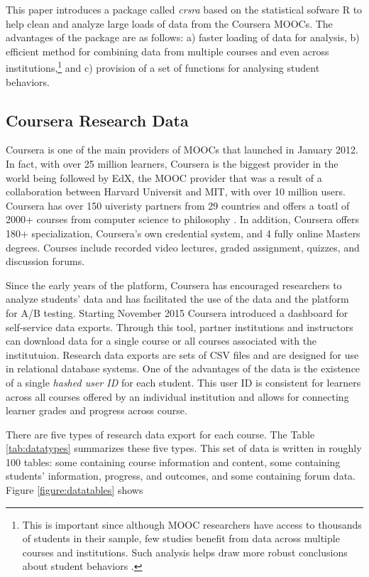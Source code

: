 This paper introduces a package called \emph{crsra} based on the
statistical sofware R to help clean and analyze large loads of data from
the Coursera MOOCs. The advantages of the package are as follows: a)
faster loading of data for analysis, b) efficient method for combining
data from multiple courses and even across
institutions,\footnote{This is important since although MOOC researchers have access to thousands of students in their sample, few studies benefit from data across multiple courses and institutions. Such analysis helps draw more robust conclusions about student behaviors \citep{reich2015rebooting}.}
and c) provision of a set of functions for analysing student behaviors.

\subsection{Coursera Research Data}\label{coursera-research-data}

Coursera is one of the main providers of MOOCs that launched in January
2012. In fact, with over 25 million learners, Coursera is the biggest
provider in the world being followed by EdX, the MOOC provider that was
a result of a collaboration between Harvard Universit and MIT, with over
10 million users. Coursera has over 150 uiveristy partners from 29
countries and offers a toatl of 2000+ courses from computer science to
philosophy \citep{coursera}. In addition, Coursera offers 180+
specialization, Coursera's own credential system, and 4 fully online
Masters degrees. Courses include recorded video lectures, graded
assignment, quizzes, and discussion forums.

Since the early years of the platform, Coursera has encouraged
researchers to analyze students' data and has facilitated the use of the
data and the platform for A/B testing. Starting November 2015 Coursera
introduced a dashboard for self-service data exports. Through this tool,
partner institutions and instructors can download data for a single
course or all courses associated with the institutuion. Research data
exports are sets of CSV files and are designed for use in relational
database systems. One of the advantages of the data is the existence of
a single \emph{hashed user ID} for each student. This user ID is
consistent for learners across all courses offered by an individual
institution and allows for connecting learner grades and progress across
course.

There are five types of research data export for each course. The Table
\ref{tab:datatypes} summarizes these five types. This set of data is
written in roughly 100 tables: some containing course information and
content, some containing students' information, progress, and outcomes,
and some containing forum data. Figure \ref{figure:datatables} shows

